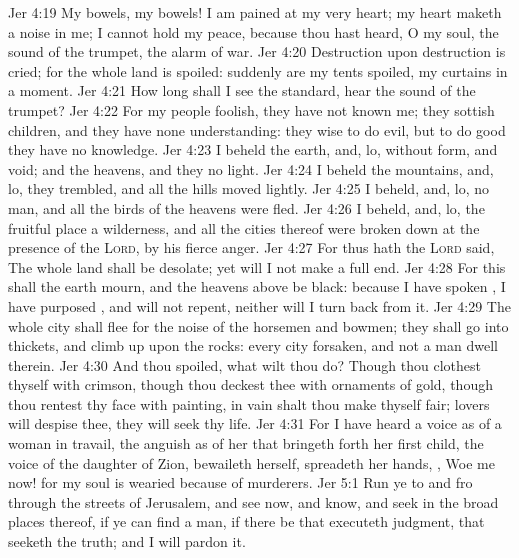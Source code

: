 \vs Jer 4:19 My bowels, my bowels! I am pained at my very heart; my heart maketh a noise in me; I cannot hold my peace, because thou hast heard, O my soul, the sound of the trumpet, the alarm of war.
\vs Jer 4:20 Destruction upon destruction is cried; for the whole land is spoiled: suddenly are my tents spoiled,  my curtains in a moment.
\vs Jer 4:21 How long shall I see the standard,  hear the sound of the trumpet?
\vs Jer 4:22 For my people  foolish, they have not known me; they  sottish children, and they have none understanding: they  wise to do evil, but to do good they have no knowledge.
\vs Jer 4:23 I beheld the earth, and, lo,  without form, and void; and the heavens, and they  no light.
\vs Jer 4:24 I beheld the mountains, and, lo, they trembled, and all the hills moved lightly.
\vs Jer 4:25 I beheld, and, lo,  no man, and all the birds of the heavens were fled.
\vs Jer 4:26 I beheld, and, lo, the fruitful place  a wilderness, and all the cities thereof were broken down at the presence of the \textsc{Lord},  by his fierce anger.
\vs Jer 4:27 For thus hath the \textsc{Lord} said, The whole land shall be desolate; yet will I not make a full end.
\vs Jer 4:28 For this shall the earth mourn, and the heavens above be black: because I have spoken , I have purposed , and will not repent, neither will I turn back from it.
\vs Jer 4:29 The whole city shall flee for the noise of the horsemen and bowmen; they shall go into thickets, and climb up upon the rocks: every city  forsaken, and not a man dwell therein.
\vs Jer 4:30 And  thou  spoiled, what wilt thou do? Though thou clothest thyself with crimson, though thou deckest thee with ornaments of gold, though thou rentest thy face with painting, in vain shalt thou make thyself fair;  lovers will despise thee, they will seek thy life.
\vs Jer 4:31 For I have heard a voice as of a woman in travail,  the anguish as of her that bringeth forth her first child, the voice of the daughter of Zion,  bewaileth herself,  spreadeth her hands, , Woe  me now! for my soul is wearied because of murderers.
\vs Jer 5:1 Run ye to and fro through the streets of Jerusalem, and see now, and know, and seek in the broad places thereof, if ye can find a man, if there be  that executeth judgment, that seeketh the truth; and I will pardon it.
